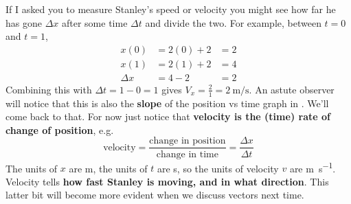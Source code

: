 \documentclass{tufte-handout}
\begin{document}
If I asked you to measure Stanley's speed or velocity you might see how far he has gone $\Delta x$ after some time $\Delta t$ and divide the two. For example, between $t=0$ and $t=1$,
\begin{align}
x(0) &= 2(0)+2 &= 2 \\
x(1) &= 2(1)+2 &= 4 \\
\Delta x &= 4 - 2 &= 2
\end{align}
Combining this with $\Delta t = 1-0 = 1$ gives $V_x=\frac{2}{1}=\SI{2}{\meter\per\second}$. An astute observer will notice that this is also the \textbf{slope} of the position vs time graph in . We'll come back to that.  For now just notice that \textbf{velocity is the (time) rate of change of position}, e.g.
\begin{equation}
\text{velocity} = \dfrac{\text{change in position}}{\text{change in time}} = \dfrac{\Delta x}{\Delta t}
\end{equation}
The units of $x$ are \si{\meter}, the units of $t$ are \si{\second}, so the units of velocity $v$ are \si{\meter\per\second}. Velocity tells \textbf{how fast Stanley is moving, and in what direction}. This latter bit will become more evident when we discuss vectors next time. 
\end{document}
